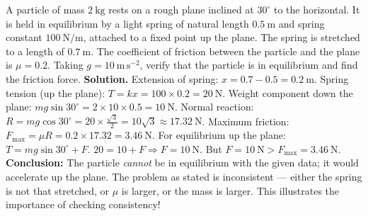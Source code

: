 \documentclass[11pt]{article}
\begin{document}
\begin{exoresolu}
A particle of mass $2\ \mathrm{kg}$ rests on a rough plane inclined at $30^\circ$ to the horizontal. It is held in equilibrium by a light spring of natural length $0.5\ \mathrm{m}$ and spring constant $100\ \mathrm{N/m}$, attached to a fixed point up the plane. The spring is stretched to a length of $0.7\ \mathrm{m}$. The coefficient of friction between the particle and the plane is $\mu = 0.2$. Taking $g = 10\ \mathrm{m\,s^{-2}}$, verify that the particle is in equilibrium and find the friction force.
\tcblower
\textbf{Solution.}
Extension of spring: $x = 0.7 - 0.5 = 0.2\ \mathrm{m}$.
Spring tension (up the plane): $T = kx = 100 \times 0.2 = 20\ \mathrm{N}$.
Weight component down the plane: $mg\sin30^\circ = 2 \times 10 \times 0.5 = 10\ \mathrm{N}$.
Normal reaction: $R = mg\cos30^\circ = 20 \times \frac{\sqrt{3}}{2} = 10\sqrt{3} \approx 17.32\ \mathrm{N}$.
Maximum friction: $F_{\text{max}} = \mu R = 0.2 \times 17.32 = 3.46\ \mathrm{N}$.
For equilibrium up the plane: $T = mg\sin30^\circ + F$.
$20 = 10 + F \Rightarrow F = 10\ \mathrm{N}$.
But $F = 10\ \mathrm{N} > F_{\text{max}} = 3.46\ \mathrm{N}$.
\textbf{Conclusion:} The particle \emph{cannot} be in equilibrium with the given data; it would accelerate up the plane. The problem as stated is inconsistent — either the spring is not that stretched, or $\mu$ is larger, or the mass is larger. This illustrates the importance of checking consistency!
\end{exoresolu}
\end{document}
